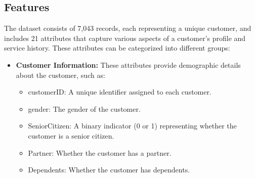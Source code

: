\subsection{Features}
The dataset consists of 7,043 records, each representing a unique customer, and includes 21 attributes that capture various aspects of a customer’s profile and service history. These attributes can be categorized into different groups:
\begin{itemize}
    \item \textbf{Customer Information:} These attributes provide demographic details about the customer, such as:
    \begin{itemize}
        \item customerID: A unique identifier assigned to each customer.
        \item gender: The gender of the customer.
        \item SeniorCitizen: A binary indicator (0 or 1) representing whether the customer is a senior citizen.
        \item Partner: Whether the customer has a partner.
        \item Dependents: Whether the customer has dependents.
    \end{itemize}
\end{itemize}
